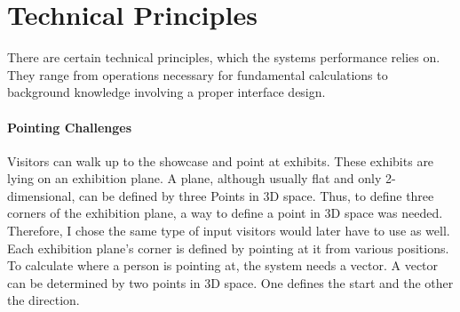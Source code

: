 
\section{Technical Principles}
\label{installation_tech}

There are certain technical principles, which the systems performance relies on. They range from operations necessary for fundamental calculations to background knowledge involving a proper interface design.


\paragraph{Pointing Challenges}

Visitors can walk up to the showcase and point at exhibits. These exhibits are lying on an exhibition plane. A plane, although usually flat and only 2-dimensional, can be defined by three Points in \ac{3D} space. Thus, to define three corners of the exhibition plane, a way to define a point in \ac{3D} space was needed. Therefore, I chose the same type of input visitors would later have to use as well. Each exhibition plane's corner is defined by pointing at it from various positions. To calculate where a person is pointing at, the system needs a vector. A vector can be determined by two points in \ac{3D} space. One defines the start and the other the direction.

